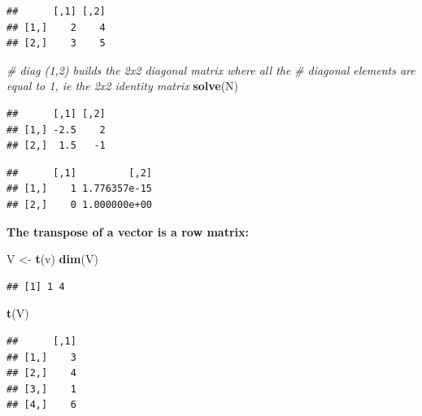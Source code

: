 \documentclass[]{book}
\newenvironment{Shaded}{\begin{snugshade}}{\end{snugshade}}
\newcommand{\CommentTok}[1]{\textcolor[rgb]{0.56,0.35,0.01}{\textit{#1}}}
\newcommand{\KeywordTok}[1]{\textcolor[rgb]{0.13,0.29,0.53}{\textbf{#1}}}
\newcommand{\NormalTok}[1]{#1}
\newcommand{\OperatorTok}[1]{\textcolor[rgb]{0.81,0.36,0.00}{\textbf{#1}}}
\newcommand{\StringTok}[1]{\textcolor[rgb]{0.31,0.60,0.02}{#1}}
\begin{document}
\begin{verbatim}
##      [,1] [,2]
## [1,]    2    4
## [2,]    3    5
\end{verbatim}

\begin{Shaded}
\begin{Highlighting}[]
\CommentTok{# diag (1,2) builds the 2x2 diagonal matrix where all the}
\CommentTok{# diagonal elements are equal to 1, ie the 2x2 identity matrix}
\KeywordTok{solve}\NormalTok{(N)}
\end{Highlighting}
\end{Shaded}

\begin{verbatim}
##      [,1] [,2]
## [1,] -2.5    2
## [2,]  1.5   -1
\end{verbatim}

\begin{Shaded}
\end{Shaded}

\begin{verbatim}
##      [,1]         [,2]
## [1,]    1 1.776357e-15
## [2,]    0 1.000000e+00
\end{verbatim}

\textbf{The transpose of a vector is a row matrix: }

\begin{Shaded}
\begin{Highlighting}[]
\NormalTok{V <-}\StringTok{ }\KeywordTok{t}\NormalTok{(v)}
\KeywordTok{dim}\NormalTok{(V)}
\end{Highlighting}
\end{Shaded}

\begin{verbatim}
## [1] 1 4
\end{verbatim}

\begin{Shaded}
\begin{Highlighting}[]
\KeywordTok{t}\NormalTok{(V)}
\end{Highlighting}
\end{Shaded}

\begin{verbatim}
##      [,1]
## [1,]    3
## [2,]    4
## [3,]    1
## [4,]    6
\end{verbatim}
\end{document}
